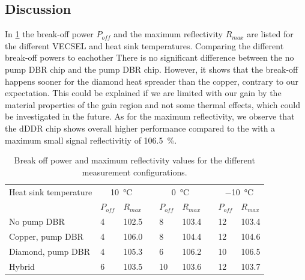 \subsection*{Discussion}

In \cref{tab:rss} the break-off power $P_{off}$ and the maximum reflectivity $R_{max}$ are listed for the different VECSEL and heat sink temperatures. Comparing the different break-off powers to eachother
There is no significant difference between the no pump DBR chip and the pump DBR chip. However, it shows that the break-off happens sooner for the diamond heat spreader than the copper, contrary to our expectation. This could be explained if we are limited with our gain by the material properties of the gain region and not some thermal effects, which could be investigated in the future. As for the maximum reflectivity, we observe that the dDDR chip shows overall higher performance compared to the with a maximum small signal reflectivitiy of \qty{106.5}{\percent}.

\begin{table}[ht]
    \centering
    \begin{tabular}{lllllllll}
        \hline
        Heat sink temperature & \multicolumn{2}{c}{\qty{10}{\celsius}} &             & \multicolumn{2}{c}{\qty{0}{\celsius}} &           & \multicolumn{2}{c}{\qty{-10}{\celsius}}                              \\ \cline{2-3} \cline{5-6} \cline{8-9}
                              & $P_{off}$                              & $R_{max}$   &                                       & $P_{off}$ & $R_{max}$                               &  & $P_{off}$ & $R_{max}$   \\ \hline
        No pump DBR           & 4                                      & \num{102.5} &                                       & 8         & \num{103.4}                             &  & 12        & \num{103.4} \\ \hline
        Copper, pump DBR      & 4                                      & \num{106.0} &                                       & 8         & \num{104.4}                             &  & 12        & \num{104.6} \\ \hline
        Diamond, pump DBR     & 4                                      & \num{105.3} &                                       & 6         & \num{106.2}                             &  & 10        & \num{106.5} \\ \hline
        Hybrid                & 6                                      & \num{103.5} &                                       & 10        & \num{103.6}                             &  & 12        & \num{103.7}
    \end{tabular}
    \caption{Break off power and maximum reflectivity values for the different measurement configurations.}
    \label{tab:rss}
\end{table}
\vspace{-2\baselineskip}

